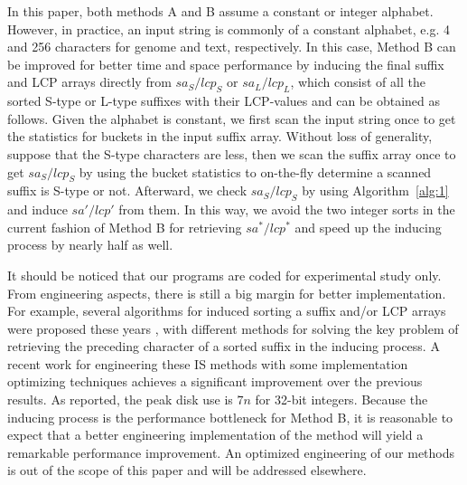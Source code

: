 \documentclass[10pt,journal,compsoc]{IEEEtran}
\begin{document}

In this paper, both methods A and B assume a constant or integer alphabet. However, in practice, an input string is commonly of a constant alphabet, e.g. 4 and 256 characters for genome and text, respectively. In this case, Method B can be improved for better time and space performance by inducing the final suffix and LCP arrays directly from $sa_S/lcp_S$ or $sa_L/lcp_L$, which consist of all the sorted S-type or L-type suffixes with their LCP-values and can be obtained as follows. Given the alphabet is constant, we first scan the input string once to get the statistics for buckets in the input suffix array. Without loss of generality, suppose that the S-type characters are less, then we scan the suffix array once to get $sa_S/lcp_S$ by using the bucket statistics to on-the-fly determine a scanned suffix is S-type or not. Afterward, we check $sa_S/lcp_S$ by using Algorithm~\ref{alg:1} and induce $sa'/lcp'$ from them. In this way, we avoid the two integer sorts in the current fashion of Method B for retrieving $sa^*/lcp^*$ and speed up the inducing process by nearly half as well.

It should be noticed that our programs are coded for experimental study only. From engineering aspects, there is still a big margin for better implementation. For example, several algorithms for induced sorting a suffix and/or LCP arrays were proposed these years \cite{Nong15,Nong14,Bingmann12}, with different methods for solving the key problem of retrieving the preceding character of a sorted suffix in the inducing process. A recent work \cite{Karkkainen2017} for engineering these IS methods with some implementation optimizing techniques achieves a significant improvement over the previous results. As reported, the peak disk use is $7n$ for 32-bit integers. Because the inducing process is the performance bottleneck for Method B, it is reasonable to expect that a better engineering implementation of the method will yield a remarkable performance improvement. An optimized engineering of our methods is out of the scope of this paper and will be addressed elsewhere.
\end{document}
